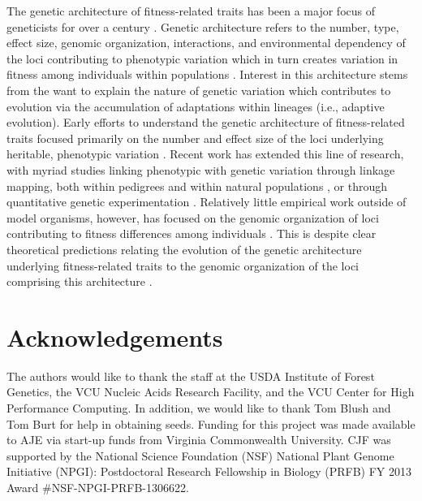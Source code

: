 \documentclass[11pt]{article}
\begin{document}
The genetic architecture of fitness-related traits has been a major focus of geneticists for 
over a century \citep[reviewed by][]{Ellegren:2008}. Genetic architecture refers to the number, type, effect size, 
genomic organization, interactions, and environmental dependency of the loci contributing to phenotypic variation 
which in turn creates variation in fitness among individuals within populations \citep[cf.][]{Eckert:2012a}. 
Interest in this architecture stems from the want to explain the nature of genetic variation which 
contributes to evolution via the accumulation of adaptations within lineages (i.e., adaptive evolution).
Early efforts to understand the genetic architecture of fitness-related traits
focused primarily on the number and effect size of the loci underlying heritable, phenotypic variation \citep{Fisher:1918}. 
Recent work has extended this line of research, with myriad studies linking phenotypic with genetic variation 
through linkage mapping, both within pedigrees \citep{Mauricio:2001, Neale:2011, Ritland:2011} and within 
natural populations \citep{Ingvarsson:2011, Eckert:2013a}, 
or through quantitative genetic experimentation \citep{Anderson:2013a, Anderson:2013b, Fournier-Level:2013}. Relatively 
little empirical work outside of model organisms, however, has focused on the genomic organization 
of loci contributing to fitness differences 
among individuals \citep[but see][]{Stevison:2011}. This is despite clear theoretical predictions relating the evolution of 
the genetic architecture underlying fitness-related traits to the genomic organization of the loci comprising this architecture 
\citep{Kirkpatrick:2006, Yeaman:2011, Yeaman:2013}.

\section*{Acknowledgements}

The authors would like to thank the staff at the USDA Institute of Forest Genetics, the 
VCU Nucleic Acids Research Facility, and the VCU Center for High Performance Computing. 
In addition, we would like to thank Tom Blush and Tom Burt for help in obtaining 
seeds. Funding for this project was made available to AJE via start-up funds from Virginia 
Commonwealth University. CJF was supported by the National Science Foundation (NSF) National Plant Genome 
Initiative (NPGI): Postdoctoral Research Fellowship in Biology (PRFB) FY 2013 Award \#NSF-NPGI-PRFB-1306622.

\clearpage
\end{document}
